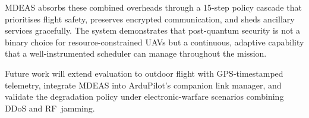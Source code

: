 \documentclass[conference]{IEEEtran}
\newcommand{\mdeas}{\textsc{MDEAS}}
\begin{document}
\mdeas{} absorbs these combined overheads through a 15-step policy
cascade that prioritises flight safety, preserves encrypted
communication, and sheds ancillary services gracefully.  The system
demonstrates that post-quantum security is not a binary choice for
resource-constrained UAVs but a continuous, adaptive capability that
a well-instrumented scheduler can manage throughout the mission.

Future work will extend evaluation to outdoor flight with
GPS-timestamped telemetry, integrate \mdeas{} into ArduPilot's
companion link manager, and validate the degradation policy under
electronic-warfare scenarios combining DDoS and RF~jamming.

\balance


\end{document}

